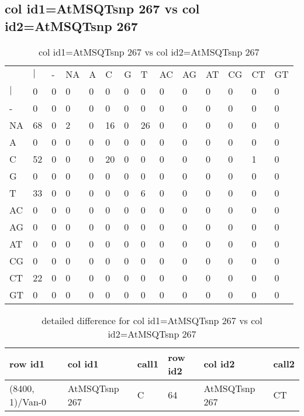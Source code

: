 \subsection{col id1=AtMSQTsnp 267 vs col id2=AtMSQTsnp 267}
\begin{center}
\begin{longtable}{|l|l|l|l|l|l|l|l|l|l|l|l|l|l|}
\caption{col id1=AtMSQTsnp 267 vs col id2=AtMSQTsnp 267} \label{table_dm618}\\
\hline
\\
\hline
&$|$&-&NA&A&C&G&T&AC&AG&AT&CG&CT&GT\\
$|$&0&0&0&0&0&0&0&0&0&0&0&0&0\\
-&0&0&0&0&0&0&0&0&0&0&0&0&0\\
NA&68&0&2&0&16&0&26&0&0&0&0&0&0\\
A&0&0&0&0&0&0&0&0&0&0&0&0&0\\
C&52&0&0&0&20&0&0&0&0&0&0&1&0\\
G&0&0&0&0&0&0&0&0&0&0&0&0&0\\
T&33&0&0&0&0&0&6&0&0&0&0&0&0\\
AC&0&0&0&0&0&0&0&0&0&0&0&0&0\\
AG&0&0&0&0&0&0&0&0&0&0&0&0&0\\
AT&0&0&0&0&0&0&0&0&0&0&0&0&0\\
CG&0&0&0&0&0&0&0&0&0&0&0&0&0\\
CT&22&0&0&0&0&0&0&0&0&0&0&0&0\\
GT&0&0&0&0&0&0&0&0&0&0&0&0&0\\
\hline
\end{longtable}
\end{center}

\begin{center}
\begin{longtable}{|l|l|l|l|l|l|}
\caption{detailed difference for col id1=AtMSQTsnp 267 vs col id2=AtMSQTsnp 267} \label{table_dm619}\\
\hline
row id1&col id1&call1&row id2&col id2&call2\\
\hline
(8400, 1)/Van-0&AtMSQTsnp 267&C&64&AtMSQTsnp 267&CT\\
\hline
\end{longtable}
\end{center}

